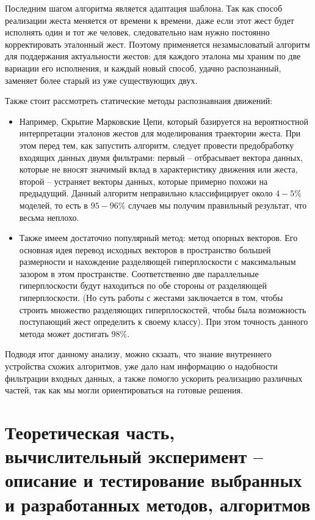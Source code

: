 Последним шагом алгоритма является адаптация шаблона. Так как способ реализации жеста меняется от времени к времени, даже если этот жест будет исполнять один и тот же человек, следовательно нам нужно постоянно корректировать эталонный жест. Поэтому применяется незамысловатый алгоритм для поддержания актуальности жестов: для каждого эталона мы храним по две вариации его исполнения, и каждый новый способ, удачно распознанный, заменяет более старый из уже существующих двух.

Также стоит рассмотреть статические методы распознавнаия движений:
\begin{itemize}
    \item Например, Скрытие Марковские Цепи, который базируется на вероятностной интерпретации эталонов жестов для моделирования траектории жеста. При этом перед тем, как запустить алгоритм, следует провести предобработку входящих данных двумя фильтрами: первый -- отбрасывает вектора данных, которые не вносят значимый вклад в характеристику движения или жеста, второй – устраняет векторы данных, которые примерно похожи на предыдущий. Данный алгоритм неправильно классифицирует около $4-5 \%$ моделей, то есть в $95-96 \%$  случаев мы получим правильный результат, что весьма неплохо.
    \item Также имеем достаточно популярный метод: метод опорных векторов. Его основная идея перевод исходных векторов в пространство большей размерности и нахождение разделяющей гиперплоскости с максимальным зазором в этом пространстве. Соответственно две параллельные гиперплоскости будут находиться по обе стороны от разделяющей гиперплоскости. (Но суть работы с жестами заключается в том, чтобы строить множество разделяющих гиперплоскостей, чтобы была возможность поступающий жест определить к своему классу). При этом точность данного метода может достигать $98 \%$.
\end{itemize}

Подводя итог данному анализу, можно скзаать, что знание внутреннего устройства схожих алгоритмов, уже дало нам информацию о надобности фильтрации входных данных, а также помогло ускорить реализацию различных частей, так как мы могли ориентироваться на готовые решения.

\section{Теоретическая часть, вычислительный эксперимент -- описание и тестирование выбранных и разработанных методов, алгоритмов}
